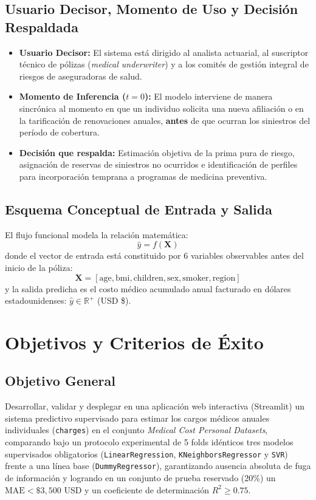 \documentclass[11pt,a4paper]{article}
\begin{document}
\subsection{Usuario Decisor, Momento de Uso y Decisión Respaldada}
\begin{itemize}[leftmargin=*]
    \item \textbf{Usuario Decisor:} El sistema está dirigido al analista actuarial, al suscriptor técnico de pólizas (\textit{medical underwriter}) y a los comités de gestión integral de riesgos de aseguradoras de salud.
    \item \textbf{Momento de Inferencia ($t = 0$):} El modelo interviene de manera sincrónica al momento en que un individuo solicita una nueva afiliación o en la tarificación de renovaciones anuales, \textbf{antes} de que ocurran los siniestros del período de cobertura.
    \item \textbf{Decisión que respalda:} Estimación objetiva de la prima pura de riesgo, asignación de reservas de siniestros no ocurridos e identificación de perfiles para incorporación temprana a programas de medicina preventiva.
\end{itemize}

\subsection{Esquema Conceptual de Entrada y Salida}
El flujo funcional modela la relación matemática:
\begin{equation}
    \hat{y} = f(\mathbf{X})
\end{equation}
donde el vector de entrada está constituido por 6 variables observables antes del inicio de la póliza:
\begin{equation}
    \mathbf{X} = [\text{age}, \text{bmi}, \text{children}, \text{sex}, \text{smoker}, \text{region}]
\end{equation}
y la salida predicha es el costo médico acumulado anual facturado en dólares estadounidenses: $\hat{y} \in \mathbb{R}^+$ (USD \$).

\section{Objetivos y Criterios de Éxito}

\subsection{Objetivo General}
Desarrollar, validar y desplegar en una aplicación web interactiva (Streamlit) un sistema predictivo supervisado para estimar los cargos médicos anuales individuales (\texttt{charges}) en el conjunto \textit{Medical Cost Personal Datasets}, comparando bajo un protocolo experimental de 5 folds idénticos tres modelos supervisados obligatorios (\texttt{LinearRegression}, \texttt{KNeighborsRegressor} y \texttt{SVR}) frente a una línea base (\texttt{DummyRegressor}), garantizando ausencia absoluta de fuga de información y logrando en un conjunto de prueba reservado (20\%) un $\text{MAE} < \$3,500$ USD y un coeficiente de determinación $R^2 \ge 0.75$.
\end{document}
